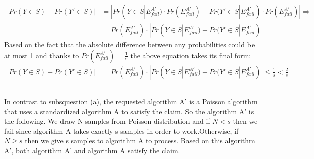 \documentclass[11pt]{537homework}
\begin{document}
\begin{align*}
|Pr(Y\in S) - Pr(Y'\in S)| &= |Pr(Y \in S | E_{fail}^{A'}) \cdot Pr(E_{fail}^{A'}) - Pr(Y' \in S | E_{fail}^{A'}) \cdot Pr(E_{fail}^{A'})| \Longrightarrow \\
 &= Pr(E_{fail}^{A'}) \cdot |Pr(Y \in S | E_{fail}^{A'}) - Pr(Y' \in S | E_{fail}^{A'})|
\end{align*}
Based on the fact that the absolute difference between any probabilities could be at most 1 and thanks to $Pr(E_{fail}^{A'}) = \frac{1}{s}$ the above equation takes its final form:
\begin{align*}
|Pr(Y\in S) - Pr(Y'\in S)| 
 &= Pr(E_{fail}^{A'}) \cdot |Pr(Y \in S | E_{fail}^{A'}) - Pr(Y' \in S | E_{fail}^{A'})| \leq \frac{1}{s} < \frac{2}{s}
\end{align*}
\subsection{}
In contrast to subsquestion (a), the requested algorithm A' is a Poisson algorithm that uses a standardized algorithm A to satisfy the claim. So the algorithm A' is the following. We draw N samples from Poisson distribution and if $N<s$ then we fail since algorithm A takes exactly s samples in order to work.Otherwise, if $N \geq s$ then we give s samples to algorithm A to process. Based on this algorithm A', both algorithm A' and algorithm A satisfy the claim.
\end{document}
